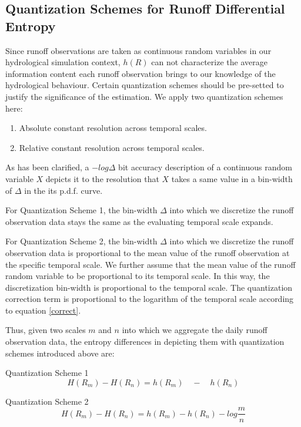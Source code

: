 \documentclass[review]{elsarticle}
\begin{document}
\subsection{Quantization Schemes for Runoff Differential Entropy}

Since runoff observations are taken as continuous random variables in our hydrological simulation context, $h(R)$ can not characterize the average information content each runoff observation brings to our knowledge of the hydrological behaviour. Certain quantization schemes should be pre-setted to justify the significance of the estimation. We apply two quantization schemes here:
\begin{enumerate}
\item Absolute constant resolution across temporal scales.
\item Relative constant resolution across temporal scales.
\end{enumerate} 

As has been clarified, a $-log\Delta$ bit accuracy description of a continuous random variable $X$ depicts it to the resolution that $X$ takes a same value in a bin-width of $\Delta$ in the its p.d.f. curve. 

For Quantization Scheme 1,  the bin-width $\Delta$ into which we discretize the runoff observation data stays the same as the evaluating temporal scale expands. 

For Quantization Scheme 2,  the bin-width $\Delta$ into which we discretize the runoff observation data is proportional to the mean value of the runoff observation at the specific temporal scale. We further assume that the mean value of the runoff random variable to be proportional to its temporal scale. In this way, the discretization bin-width is proportional to the temporal scale. The quantization correction term is proportional to the logarithm of the temporal scale according to equation \ref{correct}.

Thus, given two scales $m$ and $n$ into which we aggregate the daily runoff observation data, the entropy differences in depicting them with quantization schemes introduced above are:

Quantization Scheme 1
\begin{equation}
\label{cquantization}
H(R_m)-H(R_n)=h(R_m)\quad-\quad h(R_n) 
\iffalse
;\text{Quantization Scheme 1}
\fi
\end{equation}

Quantization Scheme 2
\begin{equation}
\label{rquantization}
H(R_m)-H(R_n)=h(R_m)-h(R_n)-log\frac{m}{n} 
\iffalse
;\text{Quantization Scheme 2}
\fi 
\end{equation} 
\end{document}

